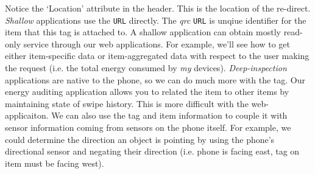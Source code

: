 Notice the `Location' attribute in the header.  This is the location of the re-direct.  \emph{Shallow} applications
use the {\tt URL} directly.  The \emph{qrc} {\tt URL} is unqiue identifier for the item that this tag is attached to.
A shallow application can obtain mostly read-only service through our web applications.  For example, we'll see how
to get either item-specific data or item-aggregated data with respect to the user making the request (i.e. the total
energy consumed by \emph{my} devices).  \emph{Deep-inspection} applications are native to the phone, so we can do much
more with the tag.  Our energy auditing application allows you to related the item to other items by maintaining state of swipe
history.  This is more difficult with the web-applicaiton.  We can also use the tag and item information to couple it with
sensor information coming from sensors on the phone itself.  For example, we could determine the direction an object
is pointing by using the phone's directional sensor and negating their direction (i.e. phone is facing east, tag on item must
be facing west).







